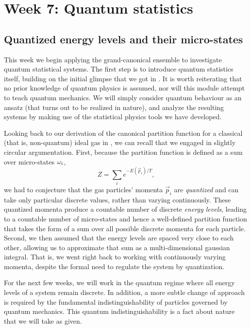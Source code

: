 \renewcommand{\thisweek}{MATH327 Week 7}
\renewcommand{\moddate}{Last modified 10 Apr.~2021}
\setcounter{section}{7}
\setcounter{subsection}{0}
{}
\section*{Week 7: Quantum statistics}
\subsection{\label{sec:quantum}Quantized energy levels and their micro-states}
This week we begin applying the grand-canonical ensemble to investigate quantum statistical systems.
The first step is to introduce quantum statistics itself, building on the initial glimpse that we got in .
It is worth reiterating that no prior knowledge of quantum physics is assumed, nor will this module attempt to teach quantum mechanics.
We will simply consider quantum behaviour as an ansatz (that turns out to be realized in nature), and analyze the resulting systems by making use of the statistical physics tools we have developed.

Looking back to our derivation of the canonical partition function for a classical (that is, non-quantum) ideal gas in , we can recall that we engaged in slightly circular argumentation.
First, because the partition function is defined as a sum over micro-states $\omega_i$,
\begin{equation*}
  Z = \sum_i e^{-E(\vec{p}_i) / T},
\end{equation*}
we had to conjecture that the gas particles' momenta $\vec{p}_i$ are \textit{quantized} and can take only particular discrete values, rather than varying continuously.
These quantized momenta produce a countable number of discrete \textit{energy levels}, leading to a countable number of micro-states and hence a well-defined partition function that takes the form of a sum over all possible discrete momenta for each particle.
Second, we then assumed that the energy levels are spaced very close to each other, allowing us to approximate that sum as a multi-dimensional gaussian integral.
That is, we went right back to working with continuously varying momenta, despite the formal need to regulate the system by quantization.

For the next few weeks, we will work in the quantum regime where all energy levels of a system remain discrete. %
In addition, a more subtle change of approach is required by the fundamental indistinguishability of particles governed by quantum mechanics.
This quantum indistinguishability is a fact about nature that we will take as given.

